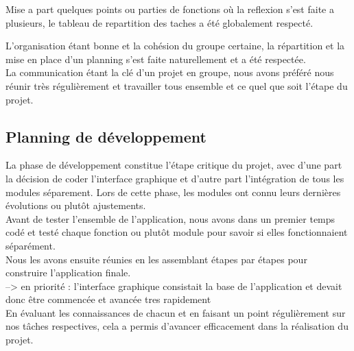 \documentclass[a4]{article}
\begin{document}
		Mise a part quelques points ou parties de fonctions où la reflexion s'est faite a plusieurs, le tableau 
		de repartition des taches a été globalement respecté.
		
		L'organisation étant bonne et la cohésion du groupe certaine, la répartition et la mise en place d'un planning 
		s'est faite naturellement et a été respectée.  \\
		La communication étant la clé d'un projet en groupe, nous avons préféré
		nous réunir très régulièrement et travailler tous ensemble et ce quel que soit l'étape du projet.
		\subsection{Planning de développement}
		La phase de développement constitue l’étape critique du projet, avec d’une part la décision de coder l’interface graphique
et d’autre part l’intégration de tous les modules séparement. Lors de cette phase, les modules ont connu leurs dernières évolutions ou plutôt ajustements. \\
Avant de tester l’ensemble de l’application, nous avons dans un premier temps codé et
testé chaque fonction ou plutôt module pour savoir si elles fonctionnaient séparément. \\
Nous les avons ensuite
réunies en les assemblant étapes par étapes pour construire l’application finale.  \\
--> en priorité : l'interface graphique consistait la base de l'application et devait donc être commencée et avancée tres rapidement \\
En évaluant les connaissances de chacun et en faisant un point régulièrement sur nos tâches respectives, cela a permis 
d'avancer efficacement dans la réalisation du projet.
\end{document}

